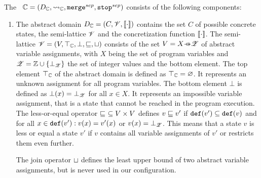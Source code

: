 The \ $\mathbb{C} = (D_{\mathbb{C}}, \rightsquigarrow_{\mathbb{C}}, \texttt{merge}^{sep}, \texttt{stop}^{sep})$ consists of the following components:
\begin{enumerate}[leftmargin=*, label=\arabic*.]
\item The abstract domain $D_{\mathbb{C}} = (C, \mathscr{V}, [\![ \cdot ]\!])$ contains the set $C$ of possible concrete states, the semi-lattice $\mathscr{V}$ and the concretization function $[\![ \cdot ]\!]$.
	The semi-lattice $\mathscr{V} = (V, \top_{\mathbb{C}}, \bot, \sqsubseteq, \sqcup)$ consists of the set $\valAssignment = X \partialFunc \valueset$ of abstract variable assignments,
	with $X$ being the set of program variables and $\mathscr{Z} = \mathbb{Z} \cup \{ \bot_{\mathscr{Z}} \}$ the set of integer values and the bottom element.
	The top element $\top_{\mathbb{C}}$ of the abstract domain is defined as $\top_{\mathbb{C}} = \varnothing$. It represents an unknown assignment for all program variables.
	The bottom element $\bot$ is defined as $\bot(x) = \bot_{\mathscr{Z}}$ for all $x \in X$.
	It represents an impossible variable assignment, that is a state that cannot be reached in the program execution.
	The less-or-equal operator $\sqsubseteq\ \subseteq V \times V$ defines $v \sqsubseteq v'$ if $\texttt{def}(v') \subseteq \texttt{def}(v)$ and for all $x \in \texttt{def}(v'): v(x) = v'(x)$ or $v(x) = \bot_{\mathscr{Z}}$.
	This means that a state $v$ is less or equal a state $v'$ if $v$ contains all variable assignments of $v'$ or restricts them even further.

	The join operator $\sqcup$ defines the least upper bound of two abstract variable assignments, but is never used in our configuration.
	

\end{enumerate}
